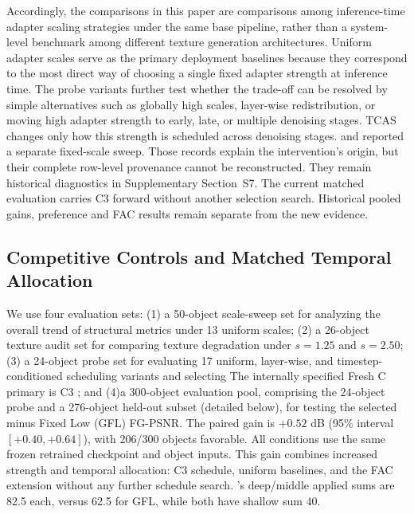 \documentclass[times,twocolumn,final]{elsarticle}
\providecommand{\DIFadd}[1]{{\protect\color{blue} \sf #1}} %
\providecommand{\DIFdel}[1]{{\protect\color{red} \scriptsize #1}} %
\providecommand{\DIFaddbegin}{} %
\providecommand{\DIFaddend}{} %
\providecommand{\DIFdelbegin}{} %
\providecommand{\DIFdelend}{} %
\begin{document}
\DIFdel{Accordingly, the comparisons in this paper are comparisons among inference-time adapter scaling strategies under the same base pipeline, rather than a system-level benchmark among different texture generation architectures.
Uniform adapter scales serve as the primary deployment baselines because they correspond to the most direct way of choosing a single fixed adapter strength at inference time. The probe variants further test whether the trade-off can be resolved by simple alternatives such as globally high scales, layer-wise redistribution, or moving high adapter strength to early, late, or multiple denoising stages. TCAS changes only how this strength is scheduled across denoising stages.
}\DIFdelend \DIFaddbegin \DIFadd{and reported a separate fixed-scale sweep. Those records explain the intervention's origin, but their complete row-level provenance cannot be reconstructed. They remain historical diagnostics in Supplementary Section~S7. The current matched evaluation carries C3 forward without another selection search. Historical pooled gains, preference and FAC results remain separate from the new evidence.
}\DIFaddend 

\DIFdelbegin %
\DIFdelend \DIFaddbegin \subsection{Competitive Controls and Matched Temporal Allocation}
\label{subsec:largescale}
\DIFaddend 

\DIFdelbegin \DIFdel{We use four evaluation sets: (1) a 50-object scale-sweep set for analyzing the overall trend of structural metrics under 13 uniform scales; (2) a 26-object texture audit set for comparing texture degradation under $s = 1.25$ and $s = 2.50$; (3) a 24-object probe set for evaluating 17 uniform, layer-wise, and timestep-conditioned scheduling variants and selecting }\DIFdelend \DIFaddbegin \DIFadd{The internally specified Fresh C primary is }\DIFaddend C3 \DIFdelbegin \DIFdel{; and (4)a 300-object evaluation pool, comprising the 24-object probe and a 276-object held-out subset (detailed below), for testing the selected }\DIFdelend \DIFaddbegin \DIFadd{minus Fixed Low (GFL) FG-PSNR. The paired gain is $+0.52$ dB (95\% interval $[+0.40,+0.64]$), with 206/300 objects favorable. All conditions use the same frozen retrained checkpoint and object inputs. This gain combines increased strength and temporal allocation: }\DIFaddend C3\DIFdelbegin \DIFdel{schedule, uniform baselines, and the FAC extension without any further schedule search. }\DIFdelend \DIFaddbegin \DIFadd{'s deep/middle applied sums are 82.5 each, versus 62.5 for GFL, while both have shallow sum 40.
}\DIFaddend 
\end{document}
